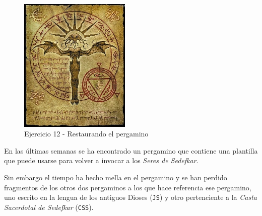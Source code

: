 \documentclass[11pt]{article}
\begin{document}
\begin{figure}[!h]
\centering
\includegraphics[width=200px]{./imgs/pergamino.jpg}
\caption{\label{fig:restaurandoElPergamino}Ejercicio 12 - Restaurando el pergamino}
\end{figure}

En las últimas semanas se ha encontrado un pergamino que contiene una
plantilla que puede usarse para volver a invocar a los \emph{Seres de Sedefkar}.

Sin embargo el tiempo ha hecho mella en el pergamino y se han perdido
fragmentos de los otros dos pergaminos a los que hace referencia ese pergamino, uno escrito en
la lengua de los antiguos Dioses (\verb~JS~) y otro pertenciente a la \emph{Casta}
\emph{Sacerdotal de Sedefkar} (\verb~CSS~).
\end{document}
